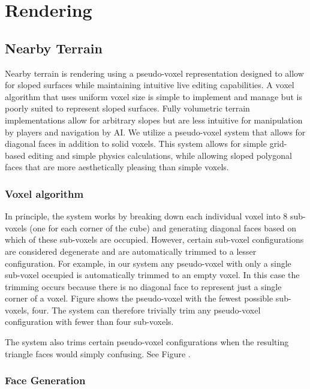 
\chapter{Rendering}

\section{Nearby Terrain}

Nearby terrain is rendering using a pseudo-voxel representation designed to allow for sloped surfaces while maintaining intuitive live editing capabilities.
A voxel algorithm that uses uniform voxel size is simple to implement and manage but is poorly suited to represent sloped surfaces.
Fully volumetric terrain implementations allow for arbitrary slopes but are less intuitive for manipulation by players and navigation by AI.
We utilize a pseudo-voxel system that allows for diagonal faces in addition to solid voxels.
This system allows for simple grid-based editing and simple physics calculations, while allowing sloped polygonal faces that are more aesthetically pleasing than simple voxels.

\subsection{Voxel algorithm}

In principle, the system works by breaking down each individual voxel into 8 sub-voxels (one for each corner of the cube) and generating diagonal faces based on which of these sub-voxels are occupied.
However, certain sub-voxel configurations are considered degenerate and are automatically trimmed to a lesser configuration.
For example, in our system any pseudo-voxel with only a single sub-voxel occupied is automatically trimmed to an empty voxel.
In this case the trimming occurs because there is no diagonal face to represent just a single corner of a voxel.
Figure  shows the pseudo-voxel with the fewest possible sub-voxels, four.
The system can therefore trivially trim any pseudo-voxel configuration with fewer than four sub-voxels.

The system also trims certain pseudo-voxel configurations when the resulting triangle faces would simply confusing.
See Figure .

\subsection{Face Generation}

